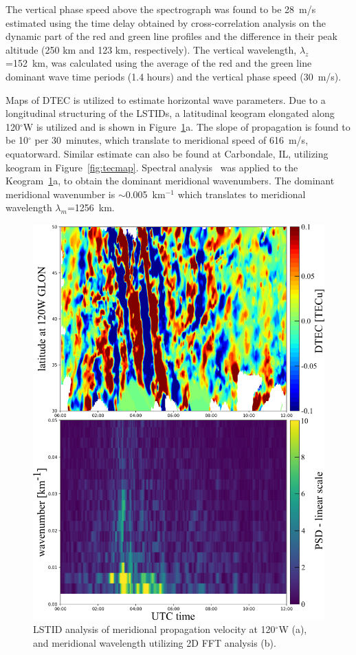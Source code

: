 \documentclass[crop=false,class=mitthesis,oneside,font=12pt]{standalone}
\begin{document}
The vertical phase speed above the spectrograph was found to be 28~m/s estimated using the time delay obtained by cross-correlation analysis on the dynamic part of the red and green line profiles and the difference in their peak altitude (250 km and 123 km, respectively). The vertical wavelength, $\lambda_z$ =152~km, was calculated using the average of the red and the green line dominant wave time periods (1.4 hours) and the vertical phase speed (30~m/s).  

Maps of DTEC is utilized to estimate horizontal wave parameters. Due to a longitudinal structuring of the LSTIDs,  a latitudinal keogram elongated along 120$^\circ$W is utilized and is shown in Figure~\ref{fig:tec_wave}a. The slope of propagation is found to be 10$^\circ$ per 30~minutes, which translate to meridional speed of 616~m/s, equatorward. Similar estimate can also be found at Carbondale, IL, utilizing keogram in Figure~\ref{fig:tecmap}. Spectral analysis~\citep{Mrak2018gw} was applied to the Keogram~\ref{fig:tec_wave}a, to obtain the dominant meridional wavenumbers. The dominant meridional wavenumber is $\sim$0.005~km$^{-1}$ which translates to meridional wavelength $\lambda_m$=1256~km.

\begin{figure}[H]
\centering\includegraphics[width=35pc]{wl.png}
\caption{LSTID analysis of meridional propagation velocity at 120$^\circ$W (a), and meridional wavelength utilizing 2D FFT analysis (b).}
\label{fig:tec_wave}
\end{figure} 
\end{document}
